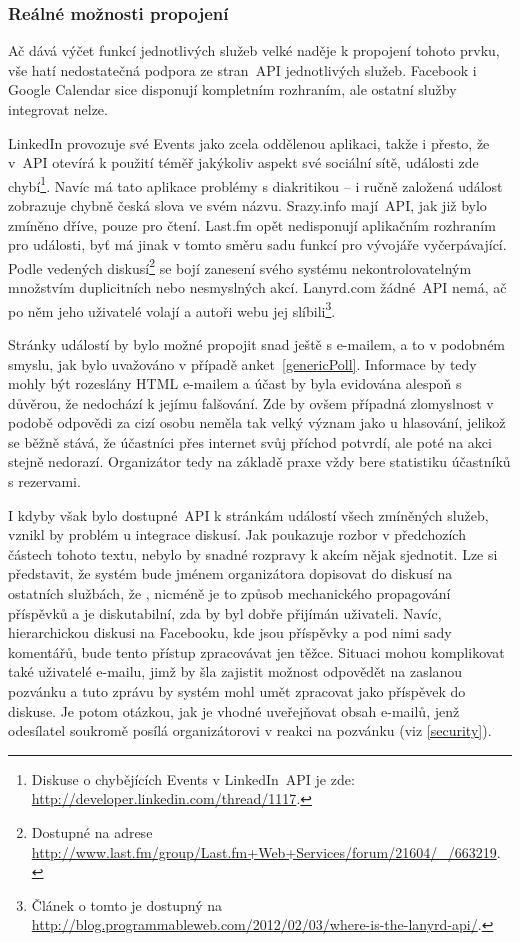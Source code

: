 \documentclass[12pt,oneside,final]{fithesis2}
\begin{document}
\subsubsection*{Reálné možnosti propojení}
Ač dává výčet funkcí jednotlivých služeb velké naděje k propojení tohoto prvku, vše hatí nedostatečná podpora ze stran~API jednotlivých služeb. Facebook i Google Calendar sice disponují kompletním rozhraním, ale ostatní služby integrovat nelze.

LinkedIn provozuje své Events jako zcela oddělenou aplikaci, takže i přesto, že v~API otevírá k použití téměř jakýkoliv aspekt své sociální sítě, události zde chybí\footnote{Diskuse o chybějících Events v LinkedIn~API je zde: \url{http://developer.linkedin.com/thread/1117}.}. Navíc má tato aplikace problémy s diakritikou -- i ručně založená událost zobrazuje chybně česká slova ve svém názvu. Srazy.info mají~API, jak již bylo zmíněno dříve, pouze pro čtení. Last.fm opět nedisponují aplikačním rozhraním pro události, byť má jinak v tomto směru sadu funkcí pro vývojáře vyčerpávající. Podle vedených diskusí\footnote{Dostupné na adrese \url{http://www.last.fm/group/Last.fm+Web+Services/forum/21604/_/663219}.} se bojí zanesení svého systému nekontrolovatelným množstvím duplicitních nebo nesmyslných akcí. Lanyrd.com žádné~API nemá, ač po něm jeho uživatelé volají a autoři webu jej slíbili\footnote{Článek o tomto je dostupný na \url{http://blog.programmableweb.com/2012/02/03/where-is-the-lanyrd-api/}.}.

Stránky událostí by bylo možné propojit snad ještě s e-mailem, a to v podobném smyslu, jak bylo uvažováno v případě anket~\ref{genericPoll}. Informace by tedy mohly být rozeslány HTML e-mailem a účast by byla evidována alespoň s důvěrou, že nedochází k jejímu falšování. Zde by ovšem případná zlomyslnost v podobě odpovědi za cizí osobu neměla tak velký význam jako u hlasování, jelikož se běžně stává, že účastníci přes internet svůj příchod potvrdí, ale poté na akci stejně nedorazí. Organizátor tedy na základě praxe vždy bere statistiku účastníků s rezervami.

I kdyby však bylo dostupné~API k stránkám událostí všech zmíněných služeb, vznikl by problém u integrace diskusí. Jak poukazuje rozbor v předchozích částech tohoto textu, nebylo by snadné rozpravy k akcím nějak sjednotit. Lze si představit, že systém bude jménem organizátora dopisovat do diskusí na ostatních službách, že , nicméně je to způsob mechanického propagování příspěvků a je diskutabilní, zda by byl dobře přijímán uživateli. Navíc, hierarchickou diskusi na Facebooku, kde jsou příspěvky a pod nimi sady komentářů, bude tento přístup zpracovávat jen těžce. Situaci mohou komplikovat také uživatelé e-mailu, jimž by šla zajistit možnost odpovědět na zaslanou pozvánku a tuto zprávu by systém mohl umět zpracovat jako příspěvek do diskuse. Je potom otázkou, jak je vhodné uveřejňovat obsah e-mailů, jenž odesílatel soukromě posílá organizátorovi v reakci na pozvánku (viz \ref{security}).
\end{document}

